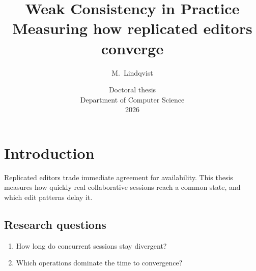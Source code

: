 \documentclass[11pt]{report}
\title{\Huge Weak Consistency in Practice\\[1em]\Large Measuring how replicated editors converge}
\author{M.~Lindqvist}
\date{Doctoral thesis\\[0.5em] Department of Computer Science\\[0.5em] 2026}
\begin{document}
\maketitle

\chapter{Introduction}
Replicated editors trade immediate agreement for availability. This thesis
measures how quickly real collaborative sessions reach a common state, and
which edit patterns delay it.

\section{Research questions}
\begin{enumerate}
  \item How long do concurrent sessions stay divergent?
  \item Which operations dominate the time to convergence?
\end{enumerate}
\end{document}
